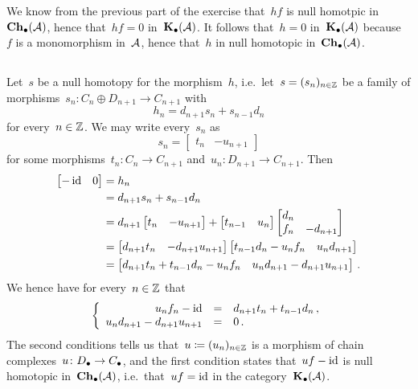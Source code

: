We know from the previous part of the exercise that~$hf$ is null homotpic in~$\mathbf{Ch}_\bullet(\mathcal{A})$, hence that~$hf = 0$ in~$\mathbf{K}_\bullet(\mathcal{A})$.
It follows that~$h = 0$ in~$\mathbf{K}_\bullet(\mathcal{A})$ because~$f$ is a monomorphism in~$\mathcal{A}$, hence that~$h$ in null homotopic in~$\mathbf{Ch}_\bullet(\mathcal{A})$.





\subsection{}

Let~$s$ be a null homotopy for the morphism~$h$, i.e.\ let~$s = (s_n)_{n \in \mathbb{Z}}$  be a family of morphisms~$s_n \colon C_n \oplus D_{n+1} \to C_{n+1}$ with
\[
    h_n
  = d_{n+1} s_n + s_{n-1} d_n
\]
for every~$n \in \mathbb{Z}$.
We may write every~$s_n$ as
\[
    s_n
  = \begin{bmatrix}
      t_n & -u_{n+1}
    \end{bmatrix}
\]
for some morphisms~$t_n \colon C_n \to C_{n+1}$ and~$u_n \colon D_{n+1} \to C_{n+1}$.
Then
\begin{align*}
      \begin{bmatrix}
        -\operatorname{id}  & 0
      \end{bmatrix}
  &=  h_n \\
  &=  d_{n+1} s_n + s_{n-1} d_n \\
  &=  d_{n+1}
      \begin{bmatrix}
        t_n & -u_{n+1}
      \end{bmatrix}
      +
      \begin{bmatrix}
        t_{n-1} & u_n
      \end{bmatrix}
      \begin{bmatrix}
        d_n &           \\
        f_n & -d_{n+1}
      \end{bmatrix} \\
  &=  \begin{bmatrix}
        d_{n+1} t_n & -d_{n+1} u_{n+1}
      \end{bmatrix}
      \begin{bmatrix}
        t_{n-1} d_n - u_n f_n & u_n d_{n+1}
      \end{bmatrix} \\
  &=  \begin{bmatrix}
        d_{n+1} t_n + t_{n-1} d_n - u_n f_n & u_n d_{n+1} - d_{n+1} u_{n+1}
      \end{bmatrix} \,.
\end{align*}
We hence have for every~$n \in \mathbb{Z}$ that
\[
  \left\{
    \begin{array}{rcl}
        u_n f_n - \operatorname{id}                 &=& d_{n+1} t_n + t_{n-1} d_n \,, \\
        u_n d_{n+1} - d_{n+1} u_{n+1} &=& 0 \,.
    \end{array}
  \right.
\]
The second conditions tells us that~$u \coloneqq (u_n)_{n \in \mathbb{Z}}$ is a morphism of chain complexes~$u \colon D_\bullet \to C_\bullet$, and the first condition states that~$uf - \operatorname{id}$ is null homotopic in~$\mathbf{Ch}_\bullet(\mathcal{A})$, i.e.\ that~$uf = \operatorname{id}$ in the category~$\mathbf{K}_\bullet(\mathcal{A})$.


